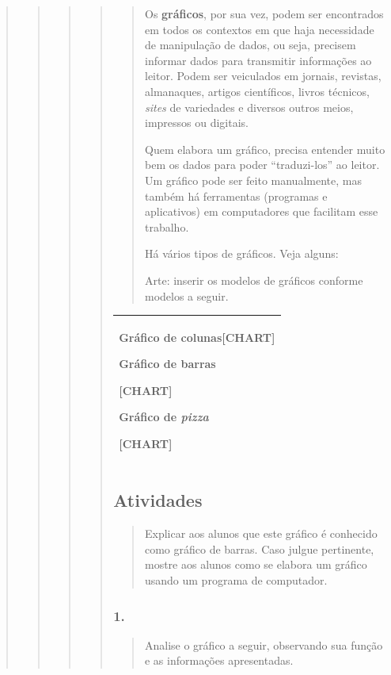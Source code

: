 \begin{quote}
\begin{quote}
\begin{quote}
\begin{quote}
\begin{quote}
Os \textbf{gráficos}, por sua vez, podem ser encontrados em todos os
contextos em que haja necessidade de manipulação de dados, ou seja,
precisem informar dados para transmitir informações ao leitor. Podem ser
veiculados em jornais, revistas, almanaques, artigos científicos, livros
técnicos, \emph{sites} de variedades e diversos outros meios, impressos
ou digitais.

Quem elabora um gráfico, precisa entender muito bem os dados para poder
``traduzi-los'' ao leitor. Um gráfico pode ser feito manualmente, mas
também há ferramentas (programas e aplicativos) em computadores que
facilitam esse trabalho.

Há vários tipos de gráficos. Veja alguns:

Arte: inserir os modelos de gráficos conforme modelos a seguir.
\end{quote}

\begin{longtable}[]{@{}l@{}}
\toprule
\begin{minipage}[t]{0.97\columnwidth}\raggedright\strut
Gráfico de colunas{{[}CHART{]}}

Gráfico de barras

{{[}CHART{]}}

Gráfico de \emph{pizza}

{{[}CHART{]}}\strut
\end{minipage}\tabularnewline
\bottomrule
\end{longtable}

\subsection{Atividades}\label{atividades-8}

\begin{quote}
Explicar aos alunos que este gráfico é conhecido como gráfico de barras.
Caso julgue pertinente, mostre aos alunos como se elabora um gráfico
usando um programa de computador.
\end{quote}

\subsubsection{1. }\label{section-66}

\begin{quote}
Analise o gráfico a seguir, observando sua função e as informações
apresentadas.


\end{quote}
\end{quote}
\end{quote}
\end{quote}
\end{quote}
